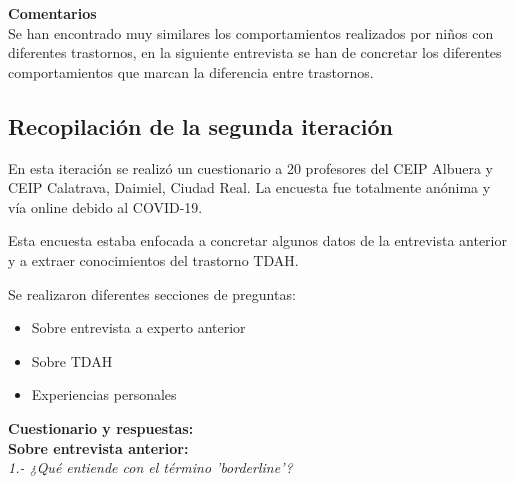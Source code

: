 \documentclass[letterpaper,12pt]{article}
\begin{document}
\begin{flushleft}
\textbf{Comentarios} \\
Se han encontrado muy similares los comportamientos realizados por niños
con diferentes trastornos, en la siguiente entrevista se han de concretar los
diferentes comportamientos que marcan la diferencia entre trastornos.\\
\end{flushleft}


\subsection{Recopilación de la segunda iteración}
\begin{flushleft}
En esta iteración se realizó un cuestionario a 20 profesores del CEIP Albuera y CEIP Calatrava, Daimiel, Ciudad Real. La encuesta fue totalmente anónima y vía online debido al COVID-19. 

\end{flushleft}
\begin{flushleft}
Esta encuesta estaba enfocada a concretar algunos datos de la entrevista anterior y a extraer conocimientos del trastorno TDAH. 
\end{flushleft}
\begin{flushleft}

Se realizaron diferentes secciones de preguntas:
\end{flushleft}
\begin{itemize}
\item Sobre entrevista a experto anterior
\item Sobre TDAH
\item Experiencias personales
\end{itemize} 
\newpage
\begin{flushleft}
\textbf{Cuestionario y respuestas:} \\
\textbf{Sobre entrevista anterior:} \\
\textit{1.- ¿Qué entiende con el término 'borderline'?}\\
\end{flushleft}
\begin{center}
 \\
\end{center}
\end{document}

